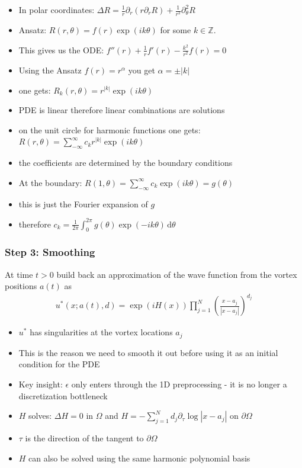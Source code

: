 \documentclass[12pt, a4paper]{article}
\theoremstyle{plain}
\theoremstyle{definition}
\newcommand{\dd}{\,\mathrm{d}}
\begin{document}
\begin{itemize}
    \item In polar coordinates: $\Delta R = \frac{1}{r} \partial_r (r \partial_r R) + \frac{1}{r^2} \partial_{\theta}^2 R$
    \item Ansatz: $R(r,\theta) = f(r) \exp (i k \theta)$ for some $k \in \mathbb Z$.
    \item This gives us the ODE: $f''(r) + \frac{1}{r} f'(r) - \frac{k^2}{r^2} f(r) = 0$
    \item Using the Ansatz $f(r)= r^\alpha$ you get $\alpha = \pm |k|$
    \item one gets: $R_k(r, \theta) = r^{|k|} \exp(i k \theta)$
    \item PDE is linear therefore linear combinations are solutions
    \item on the unit circle for harmonic functions one gets: $R(r, \theta) = \sum^\infty_{-\infty} c_k r^{|k|} \exp(i k \theta)$
    \item the coefficients are determined by the boundary conditions
    \item At the boundary: $R(1, \theta) = \sum^\infty_{-\infty} c_k \exp(i k \theta) = g(\theta)$
    \item this is just the Fourier expansion of $g$
    \item therefore $c_k = \frac{1}{2\pi} \int^{2\pi}_0 g(\theta) \exp (- i k \theta) \dd \theta$
\end{itemize}
\subsubsection{Step 3: Smoothing}
At time $t>0$ build back an approximation of the wave function from the vortex positions $a(t)$ as
\begin{align}
    u^* (x; a(t), d) = \exp (i H(x)) \prod^N_{j=1} (\frac{x-a_j}{|x-a_j|})^{d_j}
\end{align}
\begin{itemize}
    \item $u^*$ has singularities at the vortex locations $a_j$
    \item This is the reason we need to smooth it out before using it as an initial condition for the PDE
    \item Key insight: $\epsilon$ only enters through the 1D preprocessing - it is no longer a discretization bottleneck
    \item $H$ solves: $\Delta H = 0$ in $\Omega$ and $H = - \sum^N_{j=1} d_j \partial_\tau \log |x-a_j|$ on $\partial \Omega$
    \item $\tau$ is the direction of the tangent to $\partial \Omega$
    \item $H$ can also be solved using the same harmonic polynomial basis
\end{itemize}
\end{document}
